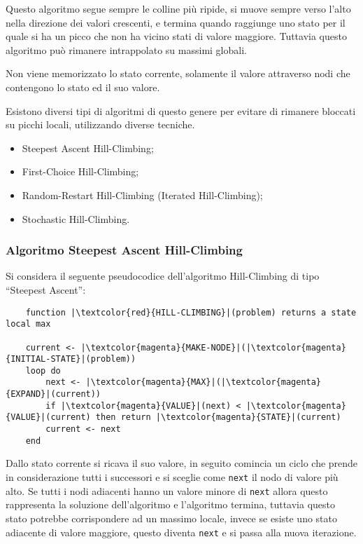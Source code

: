 \documentclass{article}
\numberwithin{equation}{subsection}
\begin{document}
Questo algoritmo segue sempre le colline più ripide, si muove sempre verso l'alto nella direzione dei valori crescenti, e termina quando raggiunge uno stato per il quale 
si ha un picco che non ha vicino stati di valore maggiore. Tuttavia questo algoritmo può rimanere intrappolato su massimi globali. 

Non viene memorizzato lo stato corrente, solamente il valore attraverso nodi che contengono lo stato ed il suo valore. 

Esistono diversi tipi di algoritmi di questo genere per evitare di rimanere bloccati su picchi locali, utilizzando diverse tecniche. 
\begin{itemize}
    \item Steepest Ascent Hill-Climbing;
    \item First-Choice Hill-Climbing;
    \item Random-Restart Hill-Climbing (Iterated Hill-Climbing);
    \item Stochastic Hill-Climbing. 
\end{itemize}

\subsubsection{Algoritmo Steepest Ascent Hill-Climbing}

Si considera il seguente pseudocodice dell'algoritmo Hill-Climbing di tipo ``Steepest Ascent'':

\begin{verbatim}
    function |\textcolor{red}{HILL-CLIMBING}|(problem) returns a state local max

    current <- |\textcolor{magenta}{MAKE-NODE}|(|\textcolor{magenta}{INITIAL-STATE}|(problem))
    loop do 
        next <- |\textcolor{magenta}{MAX}|(|\textcolor{magenta}{EXPAND}|(current))
        if |\textcolor{magenta}{VALUE}|(next) < |\textcolor{magenta}{VALUE}|(current) then return |\textcolor{magenta}{STATE}|(current)
        current <- next
    end
\end{verbatim}

Dallo stato corrente si ricava il suo valore, in seguito comincia un ciclo che prende in considerazione tutti i successori e si sceglie come \verb|next| il nodo di 
valore più alto. Se tutti i nodi adiacenti hanno un valore minore di \verb|next| allora questo rappresenta la soluzione dell'algoritmo e l'algoritmo termina, tuttavia 
questo stato potrebbe corrispondere ad un massimo locale, invece se esiste uno stato adiacente di valore maggiore, questo diventa \verb|next| e si passa alla nuova 
iterazione. 
\end{document}
